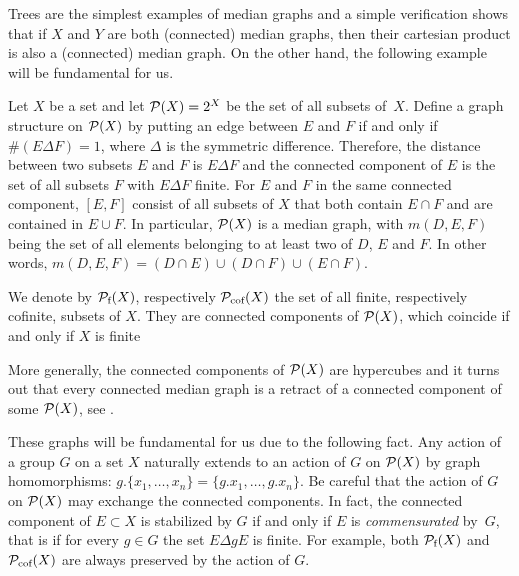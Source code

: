 Trees are the simplest examples of median graphs and a simple verification shows that if $X$ and $Y$ are both (connected) median graphs, then their cartesian product is also a (connected) median graph.
On the other hand, the following example will be fundamental for us.
%
%
\begin{exmp}\label{Ex:MainMedian}
Let $X$ be a set and let  $\mathcal P(X)=2^X$ be the set of all subsets of~$X$.
Define a graph structure on $\mathcal P(X)$ by putting an edge between $E$ and $F$ if and only if $\#(E\Delta F)=1$, where $\Delta$ is the symmetric difference.
Therefore, the distance between two subsets $E$ and $F$ is $E\Delta F$ and
the connected component of $E$ is the set of all subsets $F$ with $E\Delta F$ finite.
For $E$ and $F$ in the same connected component, $[E,F]$ consist of all subsets of $X$ that both contain $E\cap F$ and are contained in $E\cup F$.
In particular, $\mathcal P(X)$ is a median graph, with $m(D,E,F)$ being the set of all elements belonging to at least two of $D$, $E$ and $F$. In other words, $m(D,E,F)=(D\cap E)\cup(D\cap F)\cup(E\cap F)$.
\end{exmp}
%
%
We denote by $\mathcal P_{\textnormal{f}}(X)$, respectively $\mathcal P_{\textnormal{cof}}(X)$ the set of all finite, respectively cofinite, subsets of $X$.
They are connected components of $\mathcal P(X)$, which coincide if and only if $X$ is finite

More generally, the connected components of $\mathcal P(X)$ are hypercubes and it turns out that every connected median graph is a retract of a connected component of some $\mathcal P(X)$, see \cite{Bandelt1984}.

These graphs will be fundamental for us due to the following fact.
Any action of a group $G$ on a set $X$ naturally extends to an action of $G$ on $\mathcal P(X)$ by graph homomorphisms: $g.\{x_1,\dots,x_n\}=\{g.x_1,\dots,g.x_n\}$.
Be careful that the action of $G$ on $\mathcal P(X)$ may exchange the connected components.
In fact, the connected component of $E\subset X$ is stabilized by $G$ if and only if $E$ is \emph{commensurated} by~$G$, that is if for every $g\in G$ the set $E\Delta gE$ is finite.
For example, both $\mathcal P_{\textnormal{f}}(X)$ and $\mathcal P_{\textnormal{cof}}(X)$ are always preserved by the action of $G$.

